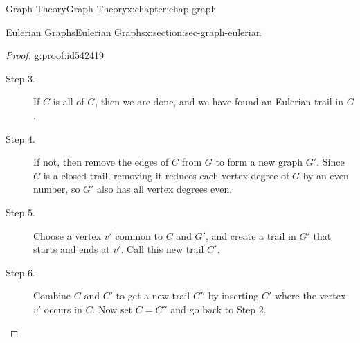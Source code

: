 \documentclass[oneside,10pt,]{book}
\numberwithin{equation}{section}
\begin{document}
\begin{chapterptx}{Graph Theory}{}{Graph Theory}{}{}{x:chapter:chap-graph}
\begin{sectionptx}{Eulerian Graphs}{}{Eulerian Graphs}{}{}{x:section:sec-graph-eulerian}
\begin{proof}{}{g:proof:id542419}
\begin{description}
\item[{Step 3.}]If \(C\) is all of \(G\), then we are done, and we have found an Eulerian trail in \(G\).%
\item[{Step 4.}]If not, then remove the edges of \(C\) from \(G\) to form a new graph \(G'\). Since \(C\) is a closed trail, removing it reduces each vertex degree of \(G\) by an even number, so \(G'\) also has all vertex degrees even.%
\item[{Step 5.}]Choose a vertex \(v'\) common to \(C\) and \(G'\), and create a trail in \(G'\) that starts and ends at \(v'\). Call this new trail \(C'\).%
\item[{Step 6.}]Combine \(C\) and \(C'\) to get a new trail \(C''\) by inserting \(C'\) where the vertex \(v'\) occurs in \(C\). Now set \(C = C''\) and go back to Step 2.%
\end{description}
%
\begin{sidebyside}{3}{0.0466666666666667}{0.0466666666666667}{0.0933333333333333}%
\begin{sbspanel}{0.24}%
\end{sbspanel}
\end{sidebyside}
\end{proof}
\end{sectionptx}
\end{chapterptx}
\end{document}
